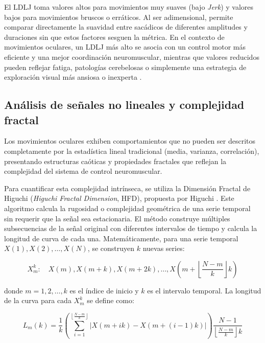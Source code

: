 El LDLJ toma valores altos para movimientos muy suaves (bajo \textit{Jerk}) y valores bajos para movimientos bruscos o erráticos. Al ser adimensional, permite comparar directamente la suavidad entre sacádicos de diferentes amplitudes y duraciones sin que estos factores sesguen la métrica. En el contexto de movimientos oculares, un LDLJ más alto se asocia con un control motor más eficiente y una mejor coordinación neuromuscular, mientras que valores reducidos pueden reflejar fatiga, patologías cerebelosas o simplemente una estrategia de exploración visual más ansiosa o inexperta \cite{holmqvist2011eye}.

\subsection{Análisis de señales no lineales y complejidad fractal}

Los movimientos oculares exhiben comportamientos que no pueden ser descritos completamente por la estadística lineal tradicional (media, varianza, correlación), presentando estructuras caóticas y propiedades fractales que reflejan la complejidad del sistema de control neuromuscular.

Para cuantificar esta complejidad intrínseca, se utiliza la Dimensión Fractal de Higuchi (\textit{Higuchi Fractal Dimension}, HFD), propuesta por Higuchi \cite{higuchi1988}. Este algoritmo calcula la rugosidad o complejidad geométrica de una serie temporal sin requerir que la señal sea estacionaria. El método construye múltiples subsecuencias de la señal original con diferentes intervalos de tiempo y calcula la longitud de curva de cada una. Matemáticamente, para una serie temporal $X(1), X(2), \dots, X(N)$, se construyen $k$ nuevas series:

\begin{equation}
	X_m^k: \quad X(m), X(m+k), X(m+2k), \dots, X\left(m + \left\lfloor \frac{N-m}{k} \right\rfloor k \right) \tag{6}
\end{equation}

donde $m = 1, 2, \dots, k$ es el índice de inicio y $k$ es el intervalo temporal. La longitud de la curva para cada $X_m^k$ se define como:

\begin{equation}
	L_m(k) = \frac{1}{k} \left( \sum_{i=1}^{\left\lfloor \frac{N-m}{k} \right\rfloor} \left| X(m+ik) - X(m+(i-1)k) \right| \right) \frac{N-1}{\left\lfloor \frac{N-m}{k} \right\rfloor k} \tag{7}
\end{equation}

